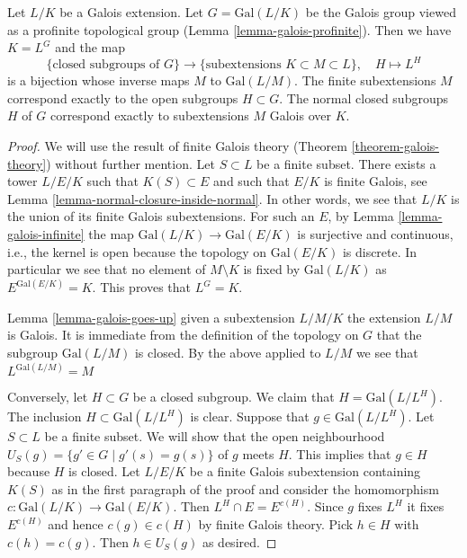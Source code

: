 \begin{theorem}
\label{theorem-inifinite-galois-theory}
Let $L/K$ be a Galois extension. Let $G = \text{Gal}(L/K)$
be the Galois group viewed as a profinite topological group
(Lemma \ref{lemma-galois-profinite}). Then we have $K = L^G$ and the map
$$
\{\text{closed subgroups of }G\}
\longrightarrow
\{\text{subextensions }K \subset M \subset L\},\quad
H \longmapsto L^H
$$
is a bijection whose inverse maps $M$ to $\text{Gal}(L/M)$.
The finite subextensions $M$ correspond exactly to the open
subgroups $H \subset G$. The normal closed subgroups $H$ of $G$
correspond exactly to subextensions $M$ Galois over $K$.
\end{theorem}

\begin{proof}
We will use the result of finite Galois theory
(Theorem \ref{theorem-galois-theory})
without further mention.
Let $S \subset L$ be a finite subset. There exists a tower
$L/E/K$ such that $K(S) \subset E$ and such that
$E/K$ is finite Galois, see Lemma \ref{lemma-normal-closure-inside-normal}.
In other words, we see that $L/K$ is the union of its finite
Galois subextensions.
For such an $E$, by Lemma \ref{lemma-galois-infinite}
the map $\text{Gal}(L/K) \to \text{Gal}(E/K)$ is surjective
and continuous, i.e., the kernel is open because the topology
on $\text{Gal}(E/K)$ is discrete.
In particular we see that no element of $M \setminus K$ is fixed by
$\text{Gal}(L/K)$ as $E^{\text{Gal}(E/K)} = K$.
This proves that $L^G = K$.

\medskip\noindent
Lemma \ref{lemma-galois-goes-up} given a subextension $L/M/K$
the extension $L/M$ is Galois. It is immediate from the definition
of the topology on $G$ that the subgroup $\text{Gal}(L/M)$ is closed.
By the above applied to $L/M$ we see that $L^{\text{Gal}(L/M)} = M$

\medskip\noindent
Conversely, let $H \subset G$ be a closed subgroup. We claim that
$H = \text{Gal}(L/L^H)$. The inclusion $H \subset \text{Gal}(L/L^H)$
is clear. Suppose that $g \in \text{Gal}(L/L^H)$. Let $S \subset L$
be a finite subset. We will show that the open neighbourhood
$U_S(g) = \{g' \in G \mid g'(s) = g(s)\}$ of $g$ meets $H$.
This implies that $g \in H$ because $H$ is closed.
Let $L/E/K$ be a finite Galois subextension containing $K(S)$
as in the first paragraph of the proof and consider the homomorphism
$c : \text{Gal}(L/K) \to \text{Gal}(E/K)$.
Then $L^H \cap E = E^{c(H)}$. Since $g$ fixes $L^H$ it fixes
$E^{c(H)}$ and hence $c(g) \in c(H)$ by finite Galois theory.
Pick $h \in H$ with $c(h) = c(g)$. Then $h \in U_S(g)$ as desired.


\end{proof}
